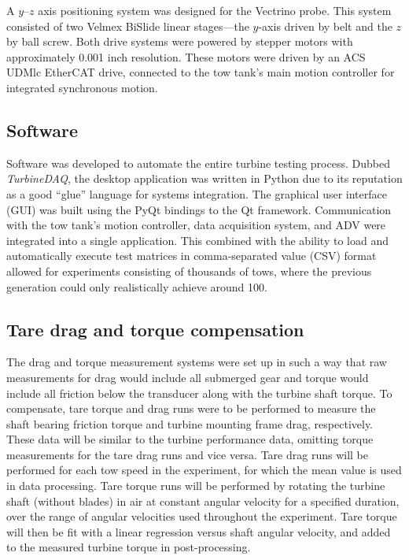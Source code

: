 A $y$--$z$ axis positioning system was designed for the Vectrino probe. This
system consisted of two Velmex BiSlide linear stages---the $y$-axis driven by
belt and the $z$ by ball screw. Both drive systems were powered by stepper
motors with approximately 0.001 inch resolution. These motors were driven by an
ACS UDMlc EtherCAT drive, connected to the tow tank's main motion controller for
integrated synchronous motion.


\subsection{Software}

Software was developed to automate the entire turbine testing process. Dubbed
\textit{TurbineDAQ}, the desktop application was written in Python due to its
reputation as a good ``glue'' language for systems integration. The graphical
user interface (GUI) was built using the PyQt bindings to the Qt framework.
Communication with the tow tank's motion controller, data acquisition system,
and ADV were integrated into a single application. This combined with the
ability to load and automatically execute test matrices in comma-separated value
(CSV) format allowed for experiments consisting of thousands of tows, where the
previous generation could only realistically achieve around 100.


\subsection{Tare drag and torque compensation} 

The drag and torque measurement systems were set up in such a way that raw
measurements for drag would include all submerged gear and torque would include
all friction below the transducer along with the turbine shaft torque. To
compensate, tare torque and drag runs were to be performed to measure the shaft
bearing friction torque and turbine mounting frame drag, respectively. These
data will be similar to the turbine performance data, omitting torque
measurements for the tare drag runs and vice versa. Tare drag runs will be
performed for each tow speed in the experiment, for which the mean value is used
in data processing. Tare torque runs will be performed by rotating the turbine
shaft (without blades) in air at constant angular velocity for a specified
duration, over the range of angular velocities used throughout the experiment.
Tare torque will then be fit with a linear regression versus shaft angular
velocity, and added to the measured turbine torque in post-processing.


